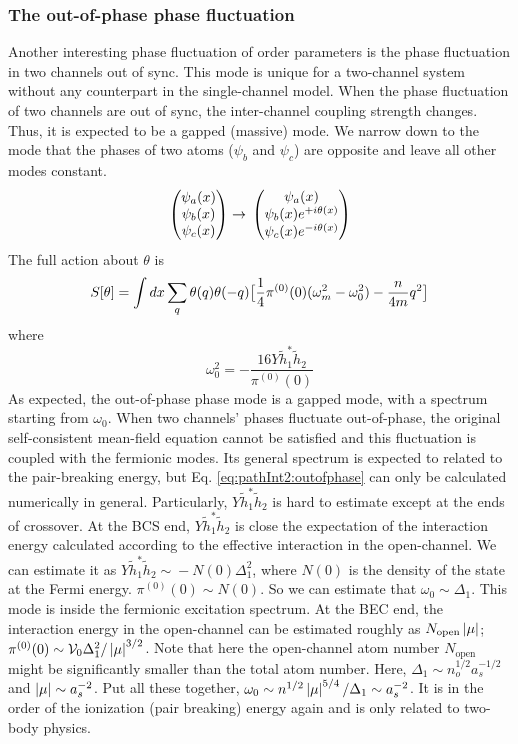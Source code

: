 \documentclass[reprint,pra]{revtex4-1}
\begin{document}
\subsubsection{The out-of-phase phase fluctuation}
Another interesting phase fluctuation of order parameters is the  phase fluctuation in two channels out of sync.  This mode is unique for a two-channel system without any counterpart in the single-channel model.  When  the phase fluctuation of two channels are out of  sync,  the inter-channel coupling strength changes.  Thus, it is  expected to be  a gapped (massive) mode.  We narrow down to the mode that the phases of two atoms  ($\psi_{b}$ and $\psi_{c}$) are opposite and leave all other modes constant.  
\begin{equation*}
\begin{pmatrix}\psi_{a}(x)\\\psi_{b}(x)\\\psi_{c}(x)\end{pmatrix}\rightarrow{}
	\begin{pmatrix}\psi_{a}(x)\\\psi_{b}(x)e^{+i\theta(x)}\\\psi_{c}(x)e^{-i\theta(x)}\end{pmatrix}
\end{equation*}
The full action about $\theta$ is 
\begin{equation}\label{eq:pathInt2:outofphase}
S[\theta]=\int{dx}\sum_{q}\theta(q)\theta(-q)\big[\frac{1}{4}\pi^{(0)}(0)(\omega_m^2-\omega_{0}^{2})-\frac{n}{4m}q^2\big]
\end{equation}
where
\begin{equation}
\omega_{0}^{2}=-\frac{16Y{\tilde{h}}_{1}^{*}{\tilde{h}}_{2}}{\pi^{(0)}(0)}
\end{equation}
As expected, the out-of-phase phase mode is a gapped mode, with a spectrum starting from $\omega_{0}$. When two channels' phases fluctuate out-of-phase, the original self-consistent mean-field equation cannot be satisfied and this fluctuation is coupled with the fermionic modes.  Its general spectrum is expected to related to the pair-breaking energy, but Eq. \ref{eq:pathInt2:outofphase} can only be calculated numerically in general.  Particularly, $Y{\tilde{h}}_{1}^{*}{\tilde{h}}_{2}$ is hard to estimate except at the ends of crossover. At the BCS end, $Y{\tilde{h}}_{1}^{*}{\tilde{h}}_{2}$ is close the expectation of the interaction energy calculated according to the effective interaction in the open-channel.  We can estimate it as $Y{\tilde{h}}_{1}^{*}{\tilde{h}}_{2}\sim{}-N(0)\Delta_{1}^{2}$, where $N(0)$ is the density of the state at the Fermi energy.  $\pi^{(0)}(0)\sim{}N(0)$.  So we can estimate that $\omega_{0}\sim\Delta_{1}$.  This mode is inside the fermionic excitation spectrum.  At the BEC end, the interaction energy in the open-channel can be estimated roughly as $N_{\text{open}}\left\lvert{\mu}\right\rvert$; $\pi^{(0)}(0)\sim{}\mathcal{V}_{0}\Delta_{1}^{2}/\left\lvert{\mu}\right\rvert^{3/2}$. Note that here the open-channel atom number $N_{\text{open}}$ might be significantly smaller than the total atom number. Here, $\Delta_{1}\sim{}n_{o}^{1/2}a_{s}^{-1/2}$ and $\left\lvert{\mu}\right\rvert\sim{}a_{s}^{-2}$.  Put all these together, $\omega_{0}\sim{}n^{1/2}\left\lvert{\mu}\right\rvert^{5/4}/\Delta_{1}\sim{}a_{s}^{-2}$. It is in the order of the ionization (pair breaking) energy again and is only related to two-body physics.  
\end{document}
